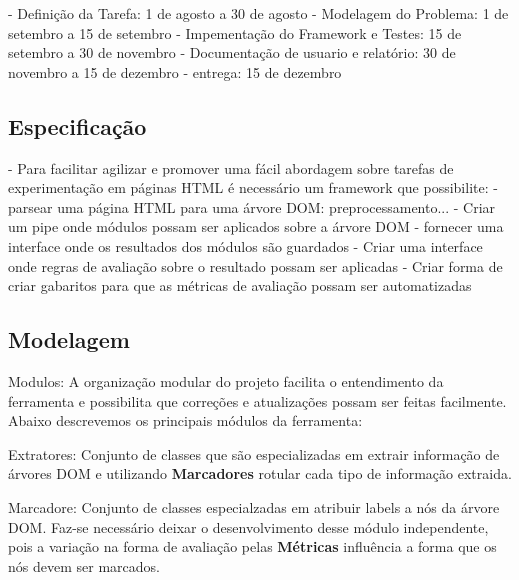 \documentclass{acm_proc_article-sp}
\numberwithin{equation}{section}
\begin{document}
	- Definição da Tarefa: 1 de agosto a 30 de agosto
	- Modelagem do Problema: 1 de setembro a 15 de setembro
	- Impementação do Framework e Testes: 15 de setembro a 30 de novembro
	- Documentação de usuario e relatório: 30 de novembro a 15 de dezembro
	- entrega: 15 de dezembro



\subsection{Especificação}

	- Para facilitar agilizar e promover uma fácil abordagem sobre tarefas de experimentação em páginas HTML é necessário um framework que possibilite:
		- parsear uma página HTML para uma árvore DOM: preprocessamento...
		- Criar um pipe onde módulos possam ser aplicados sobre a árvore DOM
		- fornecer uma interface onde os resultados dos módulos são guardados
		- Criar uma interface onde regras de avaliação sobre o resultado possam ser aplicadas
		- Criar forma de criar gabaritos para que as métricas de avaliação possam ser automatizadas


\subsection{Modelagem}

Modulos:
 A organização modular do projeto facilita o entendimento da ferramenta
 e possibilita que correções e atualizações possam ser feitas
 facilmente. Abaixo descrevemos os principais módulos da ferramenta:

 Extratores:
  Conjunto de classes que são especializadas em extrair informação de
  árvores DOM e utilizando {\bf Marcadores} rotular cada tipo de
  informação extraida.

 Marcadore:
  Conjunto de classes especialzadas em atribuir labels a nós da árvore
  DOM. Faz-se necessário deixar o desenvolvimento desse módulo
  independente, pois a variação na forma de avaliação pelas {\bf
  Métricas} influência a forma que os nós devem ser marcados.
\end{document}
